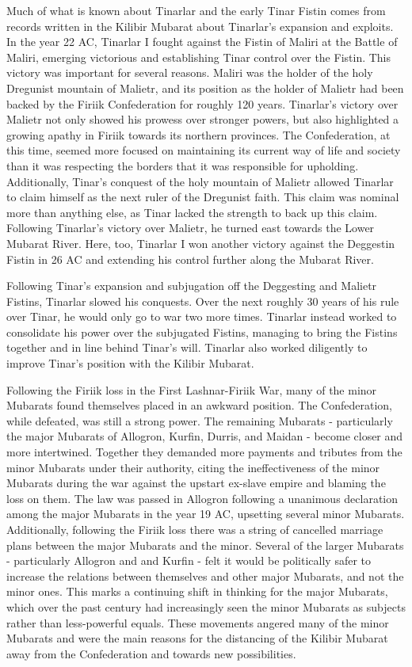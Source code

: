 \begin{multicols}{2}
						Much of what is known about Tinarlar and the early Tinar Fistin comes from records written in the Kilibir Mubarat about Tinarlar's expansion and exploits. In the year 22 AC, Tinarlar I fought against the Fistin of Maliri at the Battle of Maliri, emerging victorious and establishing Tinar control over the Fistin. This victory was important for several reasons. Maliri was the holder of the holy Dregunist mountain of Malietr, and its position as the holder of Malietr had been backed by the Firiik Confederation for roughly 120 years. Tinarlar's victory over Malietr not only showed his prowess over stronger powers, but also highlighted a growing apathy in Firiik towards its northern provinces. The Confederation, at this time, seemed more focused on maintaining its current way of life and society than it was respecting the borders that it was responsible for upholding. Additionally, Tinar's conquest of the holy mountain of Malietr allowed Tinarlar to claim himself as the next ruler of the Dregunist faith. This claim was nominal more than anything else, as Tinar lacked the strength to back up this claim. Following Tinarlar's victory over Malietr, he turned east towards the Lower Mubarat River. Here, too, Tinarlar I won another victory against the Deggestin Fistin in 26 AC and extending his control further along the Mubarat River.
						
						Following Tinar's expansion and subjugation off the Deggesting and Malietr Fistins, Tinarlar slowed his conquests. Over the next roughly 30 years of his rule over Tinar, he would only go to war two more times. Tinarlar instead worked to consolidate his power over the subjugated Fistins, managing to bring the Fistins together and in line behind Tinar's will. Tinarlar also worked diligently to improve Tinar's position with the Kilibir Mubarat.
						
						Following the Firiik loss in the First Lashnar-Firiik War, many of the minor Mubarats found themselves placed in an awkward position. The Confederation, while defeated, was still a strong power. The remaining Mubarats - particularly the major Mubarats of Allogron, Kurfin, Durris, and Maidan - become closer and more intertwined. Together they demanded more payments and tributes from the minor Mubarats under their authority, citing the ineffectiveness of the minor Mubarats during the war against the upstart ex-slave empire and blaming the loss on them. The law was passed in Allogron following a unanimous declaration among the major Mubarats in the year 19 AC, upsetting several minor Mubarats. Additionally, following the Firiik loss there was a string of cancelled marriage plans between the major Mubarats and the minor. Several of the larger Mubarats - particularly Allogron and and Kurfin - felt it would be politically safer to increase the relations between themselves and other major Mubarats, and not the minor ones. This marks a continuing shift in thinking for the major Mubarats, which over the past century had increasingly seen the minor Mubarats as subjects rather than less-powerful equals. These movements angered many of the minor Mubarats and were the main reasons for the distancing of the Kilibir Mubarat away from the Confederation and towards new possibilities.
						

\end{multicols}

